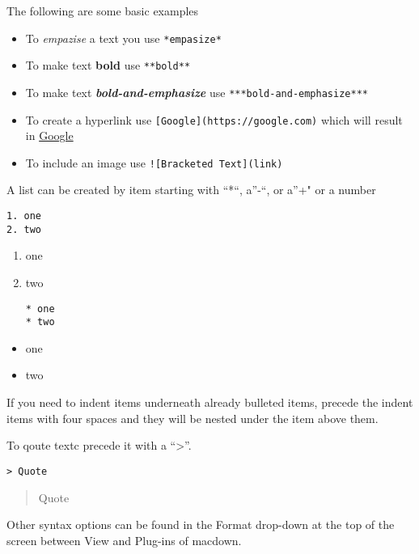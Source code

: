 The following are some basic examples

\begin{itemize}
\tightlist
\item
  To \emph{empazise} a text you use \texttt{*empasize*}
\item
  To make text \textbf{bold} use \texttt{**bold**}
\item
  To make text \textbf{\emph{bold-and-emphasize}} use
  \texttt{***bold-and-emphasize***}
\item
  To create a hyperlink use \texttt{{[}Google{]}(https://google.com)}
  which will result in \href{https://google.com}{Google}
\item
  To include an image use \texttt{!{[}Bracketed\ Text{]}(link)}
\end{itemize}

A list can be created by item starting with ``*``, a''-``, or a''+" or a
number

\begin{verbatim}
1. one
2. two
\end{verbatim}

\begin{enumerate}
\def\labelenumi{\arabic{enumi}.}
\item
  one
\item
  two

\begin{verbatim}
* one
* two
\end{verbatim}
\end{enumerate}

\begin{itemize}
\tightlist
\item
  one
\item
  two
\end{itemize}

If you need to indent items underneath already bulleted items, precede
the indent items with four spaces and they will be nested under the item
above them.

To qoute textc precede it with a ``\textgreater{}''.

\begin{verbatim}
> Quote
\end{verbatim}

\begin{quote}
Quote
\end{quote}

Other syntax options can be found in the Format drop-down at the top of
the screen between View and Plug-ins of macdown.

